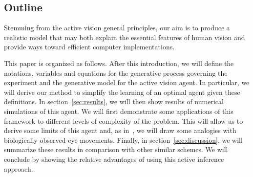 \subsection{Outline}



\fi Stemming from the active vision general principles, our aim is to produce a realistic model that may both explain the essential features of human vision and provide ways toward efficient computer implementations.

\CNS
This paper is organized as follows. After this introduction, we will define the notations, variables and equations for the generative process governing the experiment and the generative model for the active vision agent. In particular, we will derive our method to simplify the learning of an optimal agent given these definitions. In section~\ref{sec:results}, we will then show results of numerical simulations of this agent. We will first demonstrate some applications of this framework to different levels of complexity of the problem. This will allow us to derive some limits of this agent and, as in~\citep{Najemnik05}, we will draw some analogies with biologically observed eye movements. Finally, in section~\ref{sec:discussion}, we will summarize these results in comparison with other similar schemes. We will conclude by showing the relative advantages of using this active inference approach.
\fi
